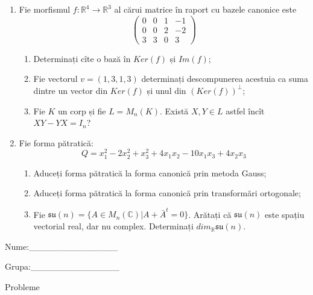 \documentclass{article}
\begin{document}
\begin{enumerate}
 \item Fie morfismul $f:\mathbb{R}^4 \to \mathbb{R}^3$ al cărui matrice în raport cu bazele canonice este
$$\begin{pmatrix}
0&0&1&-1\\
0&0&2&-2\\
3&3&0&3
\end{pmatrix}$$

\begin{enumerate}
\item Determinați cîte o bază în $Ker(f)$ și $Im(f)$;
\item Fie vectorul $v=(1,3,1,3)$ determinați descompunerea acestuia ca suma dintre un vector din $Ker(f)$ și unul din $(Ker(f))^\perp$;
\item Fie $K$ un corp și fie $L=M_n(K)$. Există $X,Y \in L$ astfel încît $XY-YX=I_n$?  
\end{enumerate}
\item Fie forma pătratică:
$$Q= x_1^2-2x_2^2+x_3^2+4x_1x_2-10x_1x_3+4x_2x_3$$

\begin{enumerate}
\item Aduceți forma pătratică la forma canonică prin metoda Gauss;
\item Aduceți forma pătratică la forma canonică prin transformări ortogonale;
\item Fie $\mathfrak{su}(n)=\{ A \in M_n(\mathbb{C}) | A+\bar{A}^t=0\}$. Arătați că $\mathfrak{su}(n)$ este spațiu vectorial real, dar nu complex.
Determinați $dim_{\mathbb{R}}\mathfrak{su}(n)$.
\end{enumerate}
\end{enumerate}
\newpage
\begin{flushright}
Nume:\_\_\_\_\_\_\_\_\_\_\_\_\_\_
 
 
Grupa:\_\_\_\_\_\_\_\_\_\_\_\_\_\_
\end{flushright}
\begin{center}
\vspace{2cm}
{\Large Probleme}
\vspace{2cm}
\end{center}
\end{document}
